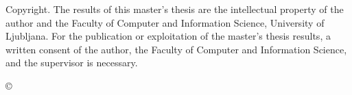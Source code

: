\thispagestyle{empty}
\vspace*{\fill}
{\noindent\footnotesize
{\sc Copyright}. The results of this master's thesis are the intellectual property of the author and the Faculty of Computer and Information Science, University of Ljubljana. For the publication or exploitation of the master's thesis results, a written consent of the author, the Faculty of Computer and Information Science, and the supervisor is necessary.}
\begin{center}
{\footnotesize{\sc \copyright \myyear\ \tauthor}}
\end{center} 